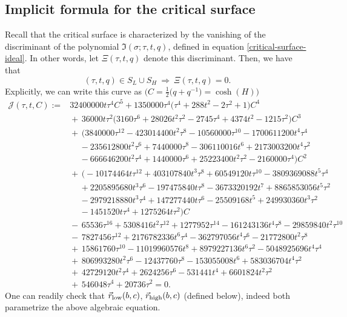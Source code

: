 \documentclass[pdftex]{sigma}
\numberwithin{equation}{section}
\begin{document}
\subsection{Implicit formula for the critical surface}
Recall that the critical surface is characterized by the vanishing of the discriminant of the polynomial $\mathfrak{I}(\sigma;\tau,t,q)$, defined in
equation \eqref{critical-surface-ideal}. In other words, let $\Xi(\tau,t,q)$ denote this discriminant. Then, we have that
 \begin{equation*}
 (\tau,t,q) \in S_{L} \cup S_{H} \ \Longrightarrow \ \Xi(\tau,t,q) = 0.
 \end{equation*}
Explicitly, we can write this curve as $\bigl(C = \frac{1}{2}\bigl(q+q^{-1}\bigr) = \cosh(H)\bigr)$
 \begin{align*}
 \mathcal{J}(\tau,t,C) :={}& 32400000 t \tau^{4}C^5 + 1350000 \tau^{4} \bigl(\tau^{4}+288 t^{2}-2 \tau^{2}+1\bigr)C^4\\
 &{}{+}\, 36000 t \tau^{2} \bigl(3160 \tau^{6}+28026 t^{2} \tau^{2}-2745 \tau^{4}+4374 t^{2}-1215 \tau^{2}\bigr)C^3\\
 &{}{+}\, \bigl(3840000 \tau^{12}-423014400 t^{2} \tau^{8}-10560000 \tau^{10}-1700611200 t^{4} \tau^{4}\\
 &{}\, \quad-235612800 t^{2} \tau^{6}+ 7440000 \tau^{8}-306110016 t^{6}+2173003200 t^{4} \tau^{2}\\
 &{}\, \quad-666646200 t^{2} \tau^{4}+1440000 \tau^{6}+ 25223400 t^{2} \tau^{2}-2160000 \tau^{4}\bigr)C^2\\
 &{}{+}\,\bigl(-10174464 t \tau^{12}+403107840 t^{3} \tau^{8}+60549120 t \tau^{10}-3809369088 t^{5} \tau^{4}\\
 &{}\, \quad+2205895680 t^{3} \tau^{6}
 -197475840 t \tau^{8}-3673320192 t^{7}+8865853056 t^{5} \tau^{2}\\
 &{}\, \quad-2979218880 t^{3} \tau^{4}+147277440 t \tau^{6}-25509168 t^{5}
 +249930360 t^{3} \tau^{2}\\
 &{}\, \quad-1451520 t \tau^{4}+1275264 t \tau^{2}\bigr)C\\
 &{}{-}\,65536 \tau^{16}+5308416 t^{2} \tau^{12}+1277952 \tau^{14}-161243136 t^{4} \tau^{8}-29859840 t^{2} \tau^{10}\\
 &{}{-}\,7827456 \tau^{12}
 +2176782336 t^{6} \tau^{4}-362797056 t^{4} \tau^{6}-21772800 t^{2} \tau^{8}\\
 &{}{+}\, 15861760 \tau^{10}-11019960576 t^{8}+8979227136 t^{6} \tau^{2}
 -5048925696 t^{4} \tau^{4}\\
 &{}{+}\,806993280 t^{2} \tau^{6}-12437760 \tau^{8}-153055008 t^{6}+583036704 t^{4} \tau^{2}\\
 &{}{+}\,42729120 t^{2} \tau^{4}+2624256 \tau^{6}-531441 t^{4}+6601824 t^{2} \tau^{2}\\
 &{}{+}\,546048 \tau^{4}+20736 \tau^{2} = 0.
 \end{align*}
One can readily check that $\vec{r}_{{\rm low}}(b,c)$, $\vec{r}_{{\rm high}}(b,c)$ (defined below), indeed both parametrize the above algebraic equation.
\end{document}
